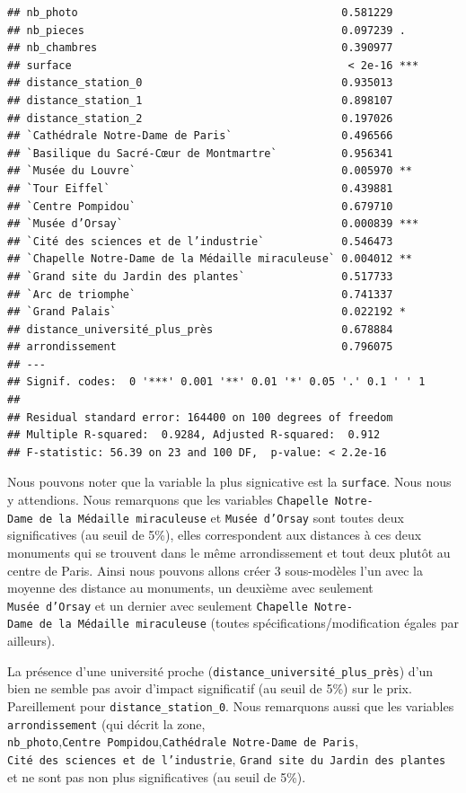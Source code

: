 \documentclass[french,]{article}
\begin{document}
\begin{verbatim}
## nb_photo                                         0.581229    
## nb_pieces                                        0.097239 .  
## nb_chambres                                      0.390977    
## surface                                           < 2e-16 ***
## distance_station_0                               0.935013    
## distance_station_1                               0.898107    
## distance_station_2                               0.197026    
## `Cathédrale Notre-Dame de Paris`                 0.496566    
## `Basilique du Sacré-Cœur de Montmartre`          0.956341    
## `Musée du Louvre`                                0.005970 ** 
## `Tour Eiffel`                                    0.439881    
## `Centre Pompidou`                                0.679710    
## `Musée d’Orsay`                                  0.000839 ***
## `Cité des sciences et de l’industrie`            0.546473    
## `Chapelle Notre-Dame de la Médaille miraculeuse` 0.004012 ** 
## `Grand site du Jardin des plantes`               0.517733    
## `Arc de triomphe`                                0.741337    
## `Grand Palais`                                   0.022192 *  
## distance_université_plus_près                    0.678884    
## arrondissement                                   0.796075    
## ---
## Signif. codes:  0 '***' 0.001 '**' 0.01 '*' 0.05 '.' 0.1 ' ' 1
## 
## Residual standard error: 164400 on 100 degrees of freedom
## Multiple R-squared:  0.9284, Adjusted R-squared:  0.912 
## F-statistic: 56.39 on 23 and 100 DF,  p-value: < 2.2e-16
\end{verbatim}

Nous pouvons noter que la variable la plus signicative est la
\texttt{surface}. Nous nous y attendions. Nous remarquons que les
variables \texttt{Chapelle\ Notre-Dame\ de\ la\ Médaille\ miraculeuse}
et \texttt{Musée\ d’Orsay} sont toutes deux significatives (au seuil de
5\%), elles correspondent aux distances à ces deux monuments qui se
trouvent dans le même arrondissement et tout deux plutôt au centre de
Paris. Ainsi nous pouvons allons créer 3 sous-modèles l'un avec la
moyenne des distance au monuments, un deuxième avec seulement
\texttt{Musée\ d’Orsay} et un dernier avec seulement
\texttt{Chapelle\ Notre-Dame\ de\ la\ Médaille\ miraculeuse} (toutes
spécifications/modification égales par ailleurs).

La présence d'une université proche
(\texttt{distance\_université\_plus\_près}) d'un bien ne semble pas
avoir d'impact significatif (au seuil de 5\%) sur le prix. Pareillement
pour \texttt{distance\_station\_0}. Nous remarquons aussi que les
variables \texttt{arrondissement} (qui décrit la zone,
\texttt{nb\_photo},\texttt{Centre\ Pompidou},\texttt{Cathédrale\ Notre-Dame\ de\ Paris},
\texttt{Cité\ des\ sciences\ et\ de\ l’industrie},
\texttt{Grand\ site\ du\ Jardin\ des\ plantes} et ne sont pas non plus
significatives (au seuil de 5\%).
\end{document}
